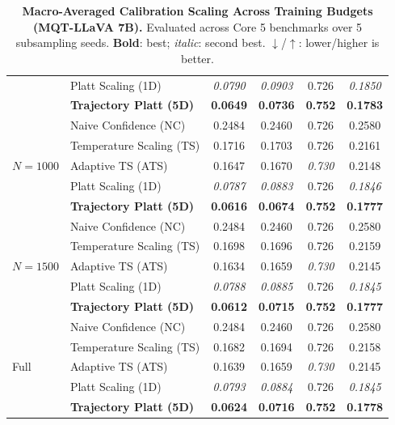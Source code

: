 \begin{table}[t]
\begin{tabular}{llcccc}
 & Platt Scaling (1D) & \textit{0.0790} & \textit{0.0903} & 0.726 & \textit{0.1850} \\
 & \textbf{Trajectory Platt (5D)} & \textbf{0.0649} & \textbf{0.0736} & \textbf{0.752} & \textbf{0.1783} \\
\midrule
\multirow{5}{*}{$N = 1000$} & Naive Confidence (NC) & 0.2484 & 0.2460 & 0.726 & 0.2580 \\
 & Temperature Scaling (TS) & 0.1716 & 0.1703 & 0.726 & 0.2161 \\
 & Adaptive TS (ATS) & 0.1647 & 0.1670 & \textit{0.730} & 0.2148 \\
 & Platt Scaling (1D) & \textit{0.0787} & \textit{0.0883} & 0.726 & \textit{0.1846} \\
 & \textbf{Trajectory Platt (5D)} & \textbf{0.0616} & \textbf{0.0674} & \textbf{0.752} & \textbf{0.1777} \\
\midrule
\multirow{5}{*}{$N = 1500$} & Naive Confidence (NC) & 0.2484 & 0.2460 & 0.726 & 0.2580 \\
 & Temperature Scaling (TS) & 0.1698 & 0.1696 & 0.726 & 0.2159 \\
 & Adaptive TS (ATS) & 0.1634 & 0.1659 & \textit{0.730} & 0.2145 \\
 & Platt Scaling (1D) & \textit{0.0788} & \textit{0.0885} & 0.726 & \textit{0.1845} \\
 & \textbf{Trajectory Platt (5D)} & \textbf{0.0612} & \textbf{0.0715} & \textbf{0.752} & \textbf{0.1777} \\
\midrule
\multirow{5}{*}{Full} & Naive Confidence (NC) & 0.2484 & 0.2460 & 0.726 & 0.2580 \\
 & Temperature Scaling (TS) & 0.1682 & 0.1694 & 0.726 & 0.2158 \\
 & Adaptive TS (ATS) & 0.1639 & 0.1659 & \textit{0.730} & 0.2145 \\
 & Platt Scaling (1D) & \textit{0.0793} & \textit{0.0884} & 0.726 & \textit{0.1845} \\
 & \textbf{Trajectory Platt (5D)} & \textbf{0.0624} & \textbf{0.0716} & \textbf{0.752} & \textbf{0.1778} \\
\bottomrule
\end{tabular}
\caption{\textbf{Macro-Averaged Calibration Scaling Across Training Budgets (MQT-LLaVA 7B).} Evaluated across Core 5 benchmarks over 5 subsampling seeds. \textbf{Bold}: best; \textit{italic}: second best. $\downarrow$/$\uparrow$: lower/higher is better.}
\label{tab:sample_efficiency_macro_mqt_full}
\end{table}
